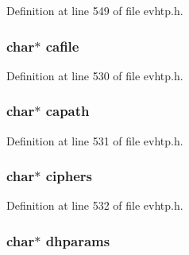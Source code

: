 Definition at line 549 of file evhtp.\-h.

\hypertarget{structevhtp__ssl__cfg__s_a9ff8d56644bac1d41f8039f2fde5acf2}{
\subsubsection[{cafile}]{\setlength{\rightskip}{0pt plus 5cm}char$\ast$ cafile}}\label{structevhtp__ssl__cfg__s_a9ff8d56644bac1d41f8039f2fde5acf2}


Definition at line 530 of file evhtp.\-h.

\hypertarget{structevhtp__ssl__cfg__s_a8331a8443119478cd6b1daeb707a94dc}{
\subsubsection[{capath}]{\setlength{\rightskip}{0pt plus 5cm}char$\ast$ capath}}\label{structevhtp__ssl__cfg__s_a8331a8443119478cd6b1daeb707a94dc}


Definition at line 531 of file evhtp.\-h.

\hypertarget{structevhtp__ssl__cfg__s_a3e4edb91e89d3cffda8059a32d60e0e8}{
\subsubsection[{ciphers}]{\setlength{\rightskip}{0pt plus 5cm}char$\ast$ ciphers}}\label{structevhtp__ssl__cfg__s_a3e4edb91e89d3cffda8059a32d60e0e8}


Definition at line 532 of file evhtp.\-h.

\hypertarget{structevhtp__ssl__cfg__s_ab62d5f6ab6c588676abce7410db0a178}{
\subsubsection[{dhparams}]{\setlength{\rightskip}{0pt plus 5cm}char$\ast$ dhparams}}\label{structevhtp__ssl__cfg__s_ab62d5f6ab6c588676abce7410db0a178}


